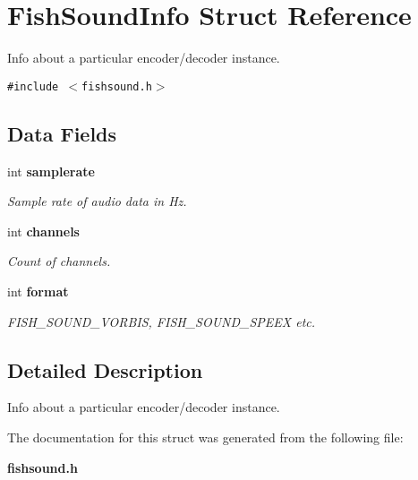 \section{Fish\-Sound\-Info Struct Reference}
\label{structFishSoundInfo}
Info about a particular encoder/decoder instance.  


{\tt \#include $<$fishsound.h$>$}

\subsection*{Data Fields}
\begin{CompactItemize}
\item 
int {\bf samplerate}\label{structFishSoundInfo_o0}

\begin{CompactList}\small\item\em Sample rate of audio data in Hz. \item\end{CompactList}\item 
int {\bf channels}\label{structFishSoundInfo_o1}

\begin{CompactList}\small\item\em Count of channels. \item\end{CompactList}\item 
int {\bf format}\label{structFishSoundInfo_o2}

\begin{CompactList}\small\item\em FISH\_\-SOUND\_\-VORBIS, FISH\_\-SOUND\_\-SPEEX etc. \item\end{CompactList}\end{CompactItemize}


\subsection{Detailed Description}
Info about a particular encoder/decoder instance. 



The documentation for this struct was generated from the following file:\begin{CompactItemize}
\item 
{\bf fishsound.h}\end{CompactItemize}
